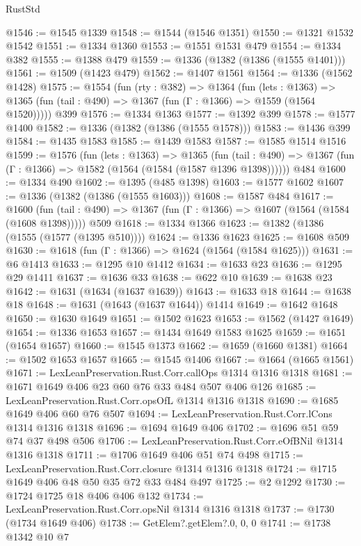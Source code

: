 \begin{lexlean}{RustStd}
\begin{coremodule}
@1546 := @1545 @1339
@1548 := @1544 (@1546 @1351)
@1550 := @1321 @1532 @1542
@1551 := @1334 @1360
@1553 := @1551 @1531 @479
@1554 := @1334 @382
@1555 := @1388 @479
@1559 := @1336 (@1382 (@1386 (@1555 @1401)))
@1561 := @1509 (@1423 @479)
@1562 := @1407 @1561
@1564 := @1336 (@1562 @1428)
@1575 := @1554
    (fun (rty : @382) =>
    @1364
      (fun (lets : @1363) =>
      @1365 (fun (tail : @490) => @1367 (fun (Γ : @1366) => @1559 (@1564 @1520)))))
    @399
@1576 := @1334 @1363
@1577 := @1392 @399
@1578 := @1577 @1400
@1582 := @1336 (@1382 (@1386 (@1555 @1578)))
@1583 := @1436 @399
@1584 := @1435 @1583
@1585 := @1439 @1583
@1587 := @1585 @1514 @1516
@1599 := @1576
    (fun (lets : @1363) =>
    @1365
      (fun (tail : @490) => @1367 (fun (Γ : @1366) => @1582 (@1564 (@1584 (@1587 @1396 @1398))))))
    @484
@1600 := @1334 @490
@1602 := @1395 (@485 @1398)
@1603 := @1577 @1602
@1607 := @1336 (@1382 (@1386 (@1555 @1603)))
@1608 := @1587 @484
@1617 := @1600
    (fun (tail : @490) => @1367 (fun (Γ : @1366) => @1607 (@1564 (@1584 (@1608 @1398)))))
    @509
@1618 := @1334 @1366
@1623 := @1382 (@1386 (@1555 (@1577 (@1395 @510))))
@1624 := @1336 @1623
@1625 := @1608 @509
@1630 := @1618 (fun (Γ : @1366) => @1624 (@1564 (@1584 @1625)))
@1631 := @6 @1413
@1633 := @1295 @10 @1412
@1634 := @1633 @23
@1636 := @1295 @29 @1411
@1637 := @1636 @33
@1638 := @622 @10
@1639 := @1638 @23
@1642 := @1631 (@1634 (@1637 @1639))
@1643 := @1633 @18
@1644 := @1638 @18
@1648 := @1631 (@1643 (@1637 @1644)) @1414
@1649 := @1642 @1648
@1650 := @1630 @1649
@1651 := @1502 @1623
@1653 := @1562 (@1427 @1649)
@1654 := @1336 @1653
@1657 := @1434 @1649 @1583 @1625
@1659 := @1651 (@1654 @1657)
@1660 := @1545 @1373
@1662 := @1659 (@1660 @1381)
@1664 := @1502 @1653 @1657
@1665 := @1545 @1406
@1667 := @1664 (@1665 @1561)
@1671 := LexLeanPreservation.Rust.Corr.callOps @1314 @1316 @1318
@1681 := @1671 @1649 @406 @23 @60 @76 @33 @484 @507 @406 @126
@1685 := LexLeanPreservation.Rust.Corr.opsOfL @1314 @1316 @1318
@1690 := @1685 @1649 @406 @60 @76 @507
@1694 := LexLeanPreservation.Rust.Corr.lCons @1314 @1316 @1318
@1696 := @1694 @1649 @406
@1702 := @1696 @51 @59 @74 @37 @498 @506
@1706 := LexLeanPreservation.Rust.Corr.eOfBNil @1314 @1316 @1318
@1711 := @1706 @1649 @406 @51 @74 @498
@1715 := LexLeanPreservation.Rust.Corr.closure @1314 @1316 @1318
@1724 := @1715 @1649 @406 @48 @50 @35 @72 @33 @484 @497
@1725 := @2 @1292
@1730 := @1724 @1725 @18 @406 @406 @132
@1734 := LexLeanPreservation.Rust.Corr.opsNil @1314 @1316 @1318
@1737 := @1730 (@1734 @1649 @406)
@1738 := GetElem?.getElem?.{0, 0, 0}
@1741 := @1738 @1342 @10 @7

\end{coremodule}
\end{lexlean}
